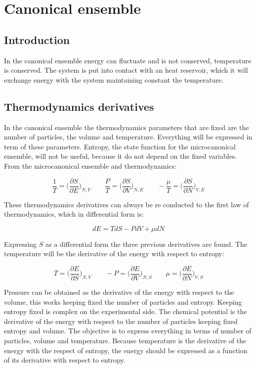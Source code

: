 \chapter{Canonical ensemble}

\section{Introduction}
In the canonical ensemble energy can fluctuate and is not conserved, temperature is conserved.
The system is put into contact with an heat reservoir, which it will exchange energy with the system maintaining constant the temperature.

\section{Thermodynamics derivatives}
In the canonical ensemble the thermodynamics parameters that are fixed are the number of particles, the volume and temperature.
Everything will be expressed in term of these parameters.
Entropy, the state function for the microcanonical ensemble, will not be useful, because it do not depend on the fixed variables.
From the microcanonical ensemble and thermodynamics:

$$\frac{1}{T} = \biggl(\frac{\partial S}{\partial E}\biggr)_{N, V}\qquad\frac{P}{T} = \biggl(\frac{\partial S}{\partial V}\biggr)_{N, E}\qquad -\frac{\mu}{T} = \biggl(\frac{\partial S}{\partial N}\biggr)_{V, E}$$

These thermodynamics derivatives can always be re conducted to the first law of thermodynamics, which in differential form is:

$$dE = TdS - PdV + \mu dN$$

Expressing $S$ as a differential form the three previous derivatives are found.
The temperature will be the derivative of the energy with respect to entropy:

$$T = \biggl(\frac{\partial E}{\partial S}\biggr)_{N, V}\qquad -P = \biggl(\frac{\partial E}{\partial V}\biggr)_{N, S}\qquad \mu = \biggl(\frac{\partial E}{\partial N}\biggr)_{V, S}$$

Pressure can be obtained as the derivative of the energy with respect to the volume, this works keeping fixed the number of particles and entropy.
Keeping entropy fixed is complex on the experimental side.
The chemical potential is the derivative of the energy with respect to the number of particles keeping fixed entropy and volume.
The objective is to express everything in terms of number of particles, volume and temperature.
Because temperature is the derivative of the energy with the respect of entropy, the energy should be expressed as a function of its derivative with respect to entropy.

